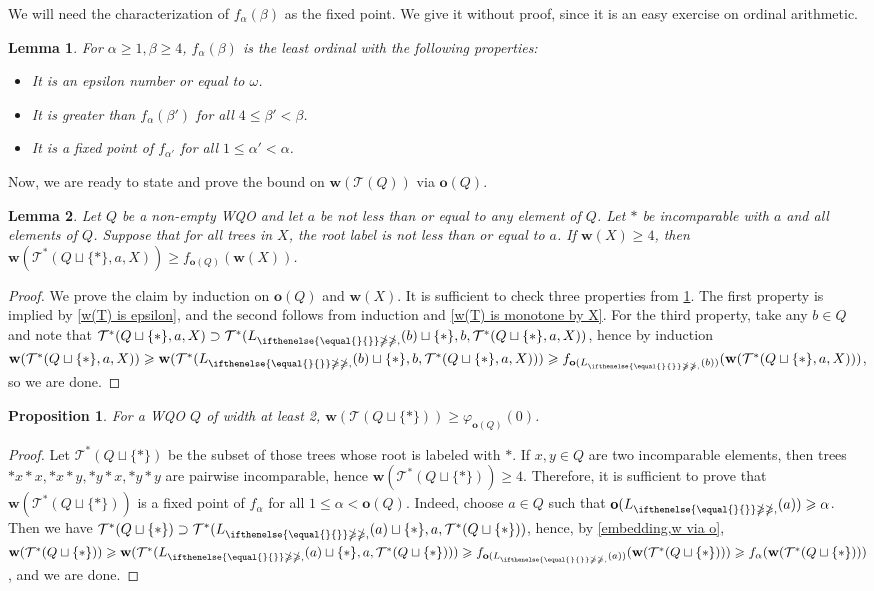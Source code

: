 \documentclass[runningheads]{llncs}
\let \leq \leqslant
\let \geq \geqslant
\let \ngeq \ngeqslant
\let \phi \varphi
\renewcommand \L [2][]{L_{\ifthenelse{\equal{#1}{}}\ngeq{\ngeq,#1}}(#2)}
\renewcommand \l [2][]{\o(\L[#1]{#2})}
\def \T {\mathcal{T}}
\def \o {\textbf{o}}
\def \w {\textbf{w}}
\newtheorem{lemma}{Lemma}
\newtheorem{proposition}{Proposition}
\begin{document}
We will need the characterization of $f_\alpha(\beta)$ as the fixed point. We give it without proof, since it is an easy exercise on ordinal arithmetic.

\begin{lemma}\label{f def}
    For $\alpha \geq 1, \beta \geq 4$, $f_\alpha(\beta)$ is the least ordinal with the following properties:
    \begin{itemize}
        \item It is an epsilon number or equal to $\omega$.
        \item It is greater than $f_\alpha(\beta')$ for all $4 \leq \beta' < \beta$.
        \item It is a fixed point of $f_{\alpha'}$ for all $1 \leq \alpha' < \alpha$.
    \end{itemize}
\end{lemma}

Now, we are ready to state and prove the bound on $\w(\T(Q))$ via $\o(Q)$.

\begin{lemma}\label{w via o}
    Let $Q$ be a non-empty WQO and let $a$ be not less than or equal to any element of $Q$.
    Let $*$ be incomparable with $a$ and all elements of $Q$.
    Suppose that for all trees in $X$, the root label is not less than or equal to $a$.
    If $\w(X) \geq 4$, then $\w(\T^*(Q\sqcup\{*\}, a, X)) \geq f_{\o(Q)}(\w(X))$.
\end{lemma}
\begin{proof}
    We prove the claim by induction on $\o(Q)$ and $\w(X)$. It is sufficient to check three properties from \cref{f def}.
    The first property is implied by \cref{w(T) is epsilon}, and the second follows from induction and \cref{w(T) is monotone by X}. For the third property, take any $b \in Q$ and note that $\T^*(Q\sqcup\{*\}, a, X) \supset \T^*(\L{b}\sqcup\{*\}, b, \T^*(Q\sqcup\{*\}, a, X))$, hence by induction $\w(\T^*(Q\sqcup\{*\}, a, X)) \geq \w(\T^*(\L{b}\sqcup\{*\}, b, \T^*(Q\sqcup\{*\}, a, X))) \geq f_{\l{b}}(\w(\T^*(Q\sqcup\{*\}, a, X)))$, so we are done.
\end{proof}

\begin{proposition}\label{w T(Q cup *)}
    For a WQO $Q$ of width at least 2, $\w(\T(Q \sqcup \{*\})) \geq \phi_{\o(Q)}(0)$.
\end{proposition}
\begin{proof}
    Let $\T^*(Q\sqcup\{*\})$ be the subset of those trees whose root is labeled with $*$. If $x,y \in Q$ are two incomparable elements, then trees $*x*x,*x*y,*y*x,*y*y$ are pairwise incomparable, hence $\w(\T^*(Q\sqcup\{*\})) \geq 4$. Therefore, it is sufficient to prove that $\w(\T^*(Q\sqcup\{*\}))$ is a fixed point of $f_\alpha$ for all $1 \leq \alpha < \o(Q)$.
    Indeed, choose $a \in Q$ such that $\l{a} \geq \alpha$. Then we have $\T^*(Q\sqcup\{*\}) \supset \T^*(\L{a}\sqcup\{*\}, a, \T^*(Q\sqcup\{*\}))$, hence, by \cref{embedding,w via o}, $\w(\T^*(Q\sqcup\{*\})) \geq \w(\T^*(\L{a}\sqcup\{*\}, a, \T^*(Q\sqcup\{*\}))) \geq f_{\l{a}}(\w(\T^*(Q\sqcup\{*\}))) \geq f_\alpha(\w(\T^*(Q\sqcup\{*\})))$, and we are done.
\end{proof}
\end{document}
